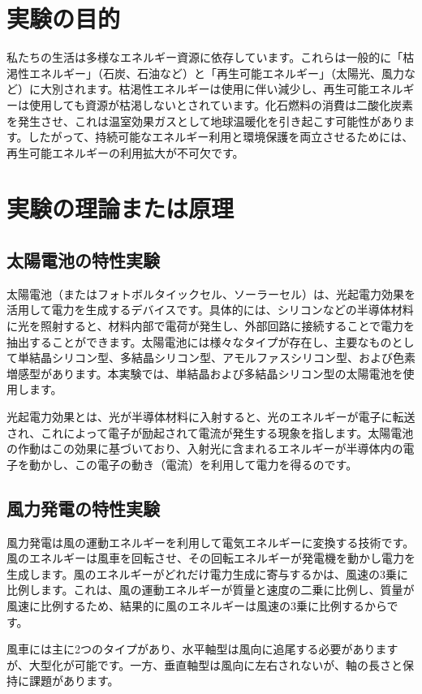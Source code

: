 \documentclass[a4paper,11pt,xelatex,ja=standard]{bxjsarticle}
\begin{document}
\section{実験の目的}

    私たちの生活は多様なエネルギー資源に依存しています。これらは一般的に「枯渇性エネルギー」（石炭、石油など）と「再生可能エネルギー」（太陽光、風力など）に大別されます。枯渇性エネルギーは使用に伴い減少し、再生可能エネルギーは使用しても資源が枯渇しないとされています。化石燃料の消費は二酸化炭素を発生させ、これは温室効果ガスとして地球温暖化を引き起こす可能性があります。したがって、持続可能なエネルギー利用と環境保護を両立させるためには、再生可能エネルギーの利用拡大が不可欠です。

\section{実験の理論または原理}
    \subsection{太陽電池の特性実験}
        太陽電池（またはフォトボルタイックセル、ソーラーセル）は、光起電力効果を活用して電力を生成するデバイスです。具体的には、シリコンなどの半導体材料に光を照射すると、材料内部で電荷が発生し、外部回路に接続することで電力を抽出することができます。太陽電池には様々なタイプが存在し、主要なものとして単結晶シリコン型、多結晶シリコン型、アモルファスシリコン型、および色素増感型があります。本実験では、単結晶および多結晶シリコン型の太陽電池を使用します。

        光起電力効果とは、光が半導体材料に入射すると、光のエネルギーが電子に転送され、これによって電子が励起されて電流が発生する現象を指します。太陽電池の作動はこの効果に基づいており、入射光に含まれるエネルギーが半導体内の電子を動かし、この電子の動き（電流）を利用して電力を得るのです。
    \subsection{風力発電の特性実験}
        風力発電は風の運動エネルギーを利用して電気エネルギーに変換する技術です。風のエネルギーは風車を回転させ、その回転エネルギーが発電機を動かし電力を生成します。風のエネルギーがどれだけ電力生成に寄与するかは、風速の3乗に比例します。これは、風の運動エネルギーが質量と速度の二乗に比例し、質量が風速に比例するため、結果的に風のエネルギーは風速の3乗に比例するからです。

        風車には主に2つのタイプがあり、水平軸型は風向に追尾する必要がありますが、大型化が可能です。一方、垂直軸型は風向に左右されないが、軸の長さと保持に課題があります。
\end{document}
